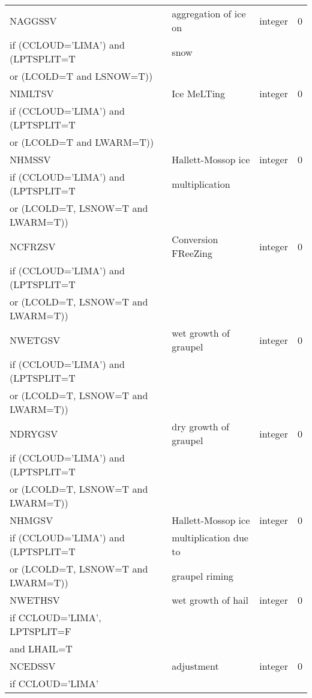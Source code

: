 \begin{longtable} {|p{}|p{}|>{\centering}p{}|p{}<{\centering}|}
NAGGSSV & aggregation of ice on  & integer & 0 \\ \nopagebreak
if (CCLOUD='LIMA') and (LPTSPLIT=T & snow&& \\ \nopagebreak
or (LCOLD=T and LSNOW=T)) &&& \\\hline

NIMLTSV & Ice MeLTing & integer & 0 \\ \nopagebreak
if (CCLOUD='LIMA') and (LPTSPLIT=T &&& \\ \nopagebreak
or (LCOLD=T and LWARM=T)) &&& \\\hline

NHMSSV & Hallett-Mossop ice  & integer & 0 \\ \nopagebreak
if (CCLOUD='LIMA') and (LPTSPLIT=T &multiplication&& \\ \nopagebreak
or (LCOLD=T, LSNOW=T and LWARM=T)) &&& \\\hline

NCFRZSV & Conversion FReeZing & integer & 0 \\ \nopagebreak
if (CCLOUD='LIMA') and (LPTSPLIT=T &&& \\ \nopagebreak
or (LCOLD=T, LSNOW=T and LWARM=T)) &&& \\\hline

NWETGSV & wet growth of graupel & integer & 0 \\ \nopagebreak
if (CCLOUD='LIMA') and (LPTSPLIT=T &&& \\ \nopagebreak
or (LCOLD=T, LSNOW=T and LWARM=T)) &&& \\\hline

NDRYGSV & dry growth of graupel & integer & 0 \\ \nopagebreak
if (CCLOUD='LIMA') and (LPTSPLIT=T &&& \\ \nopagebreak
or (LCOLD=T, LSNOW=T and LWARM=T)) &&& \\\hline

NHMGSV & Hallett-Mossop ice   & integer & 0 \\ \nopagebreak
if (CCLOUD='LIMA') and (LPTSPLIT=T &multiplication due to && \\ \nopagebreak
or (LCOLD=T, LSNOW=T and LWARM=T)) &graupel riming&& \\\hline

NWETHSV & wet growth of hail& integer & 0 \\ \nopagebreak
if CCLOUD='LIMA', LPTSPLIT=F &&& \\ \nopagebreak
and LHAIL=T &&& \\\hline

NCEDSSV & adjustment & integer & 0 \\ \nopagebreak
if CCLOUD='LIMA' &&& \\\hline


\end{longtable}

